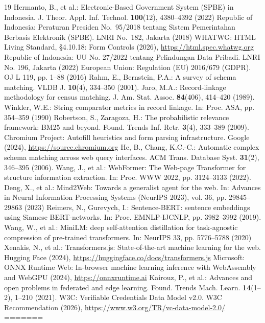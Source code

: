\documentclass[runningheads,a4paper]{llncs}
\begin{document}
\begin{thebibliography}{19}
\scriptsize
\setlength{\itemsep}{1.2pt plus 0.4pt minus 0.2pt}
 Hermanto, B., et al.: Electronic-Based Government System (SPBE) in Indonesia. J. Theor. Appl. Inf. Technol. \textbf{100}(12), 4380--4392 (2022)
 Republic of Indonesia: Peraturan Presiden No.~95/2018 tentang Sistem Pemerintahan Berbasis Elektronik (SPBE). LNRI No.~182, Jakarta (2018)
 WHATWG: HTML Living Standard, \S4.10.18: Form Controls (2026), \url{https://html.spec.whatwg.org}
 Republic of Indonesia: UU No. 27/2022 tentang Pelindungan Data Pribadi. LNRI No. 196, Jakarta (2022)
 European Union: Regulation (EU) 2016/679 (GDPR). OJ L 119, pp. 1--88 (2016)
 Rahm, E., Bernstein, P.A.: A survey of schema matching. VLDB J. \textbf{10}(4), 334--350 (2001). 
 Jaro, M.A.: Record-linkage methodology for census matching. J. Am. Stat. Assoc. \textbf{84}(406), 414--420 (1989). 
 Winkler, W.E.: String comparator metrics in record linkage. In: Proc. ASA, pp. 354--359 (1990)
 Robertson, S., Zaragoza, H.: The probabilistic relevance framework: BM25 and beyond. Found. Trends Inf. Retr. \textbf{3}(4), 333--389 (2009). 
 Chromium Project: Autofill heuristics and form parsing infrastructure. Google (2024), \url{https://source.chromium.org}
 He, B., Chang, K.C.-C.: Automatic complex schema matching across web query interfaces. ACM Trans. Database Syst. \textbf{31}(2), 346--395 (2006). 
 Wang, J., et al.: WebFormer: The Web-page Transformer for structure information extraction. In: Proc. WWW 2022, pp. 3124--3133 (2022). 
 Deng, X., et al.: Mind2Web: Towards a generalist agent for the web. In: Advances in Neural Information Processing Systems (NeurIPS 2023), vol. 36, pp. 29845--29863 (2023)
 Reimers, N., Gurevych, I.: Sentence-BERT: sentence embeddings using Siamese BERT-networks. In: Proc. EMNLP-IJCNLP, pp. 3982--3992 (2019). 
 Wang, W., et al.: MiniLM: deep self-attention distillation for task-agnostic compression of pre-trained transformers. In: NeurIPS 33, pp. 5776--5788 (2020)
 Xenakis, N., et al.: Transformers.js: State-of-the-art machine learning for the web. Hugging Face (2024), \url{https://huggingface.co/docs/transformers.js}
 Microsoft: ONNX Runtime Web: In-browser machine learning inference with WebAssembly and WebGPU (2024), \url{https://onnxruntime.ai}
 Kairouz, P., et al.: Advances and open problems in federated and edge learning. Found. Trends Mach. Learn. \textbf{14}(1--2), 1--210 (2021). 
 W3C: Verifiable Credentials Data Model v2.0. W3C Recommendation (2026), \url{https://www.w3.org/TR/vc-data-model-2.0/}
=======

\end{thebibliography}
\end{document}
